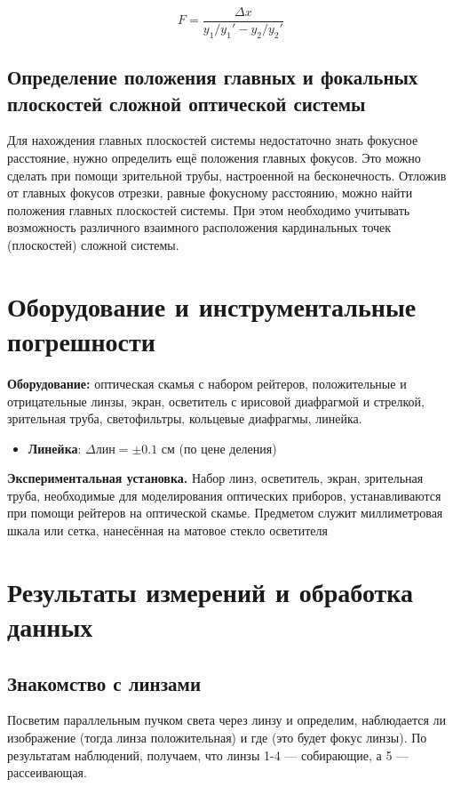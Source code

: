 \documentclass[
a4paper, %
12pt, %
]{article}
\begin{document}
	\begin{equation}
		F = \frac{\Delta x}{y_1 / y_1' - y_2 / y_2'
		}
		\label{Abbe eq}
	\end{equation}
	
	\subsection*{Определение положения главных и фокальных плоскостей сложной оптической системы}
	
	Для нахождения главных плоскостей системы недостаточно знать фокусное расстояние, нужно определить ещё положения главных фокусов. Это можно сделать при помощи зрительной трубы, настроенной на бесконечность. Отложив от главных фокусов отрезки, равные фокусному расстоянию, можно найти положения главных плоскостей системы. При этом необходимо учитывать возможность различного взаимного расположения кардинальных точек (плоскостей) сложной системы.
	
	
	
	
	\section{Оборудование и инструментальные погрешности}
	\textbf{Оборудование:} оптическая скамья с набором рейтеров, положительные и отрицательные линзы, экран, осветитель с ирисовой диафрагмой и стрелкой, зрительная труба, светофильтры, кольцевые диафрагмы, линейка.
	\begin{itemize}
		\item \textbf{Линейка}: $\Delta \text{лин} = \pm0.1$ см (по цене деления)
	\end{itemize}
	
	\noindent
	\textbf{Экспериментальная установка.} Набор линз, осветитель, экран, зрительная
	труба, необходимые для моделирования оптических приборов, устанавливаются при
	помощи рейтеров на оптической скамье. Предметом служит миллиметровая шкала
	или сетка, нанесённая на матовое стекло осветителя
	
	\section{Результаты измерений и обработка данных}
	
	\subsection{Знакомство с линзами}
	
	Посветим параллельным пучком света через линзу и определим, наблюдается ли изображение (тогда линза положительная) и где (это будет фокус линзы). По результатам наблюдений, получаем, что линзы 1-4 — собирающие, а 5 — рассеивающая.
	
\end{document}
